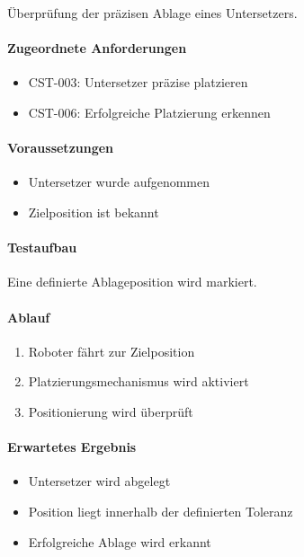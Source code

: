 \documentclass[
  a4paper,
  12pt,
  DIV=12,        %
  parskip=half,  %
  headings=small %
]{scrartcl}
\theoremstyle{definition}
\providecommand{\tightlist}{%
  \setlength{\itemsep}{0pt}\setlength{\parskip}{0pt}}
\theoremstyle{definition}
\begin{document}
Überprüfung der präzisen Ablage eines Untersetzers.

\paragraph{Zugeordnete
Anforderungen}\label{zugeordnete-anforderungen-29}

\begin{itemize}
\tightlist
\item
  CST-003: Untersetzer präzise platzieren
\item
  CST-006: Erfolgreiche Platzierung erkennen
\end{itemize}

\paragraph{Voraussetzungen}\label{voraussetzungen-28}

\begin{itemize}
\tightlist
\item
  Untersetzer wurde aufgenommen
\item
  Zielposition ist bekannt
\end{itemize}

\paragraph{Testaufbau}\label{testaufbau-5}

Eine definierte Ablageposition wird markiert.

\paragraph{Ablauf}\label{ablauf-29}

\begin{enumerate}
\def\labelenumi{\arabic{enumi}.}
\tightlist
\item
  Roboter fährt zur Zielposition
\item
  Platzierungsmechanismus wird aktiviert
\item
  Positionierung wird überprüft
\end{enumerate}

\paragraph{Erwartetes Ergebnis}\label{erwartetes-ergebnis-29}

\begin{itemize}
\tightlist
\item
  Untersetzer wird abgelegt
\item
  Position liegt innerhalb der definierten Toleranz
\item
  Erfolgreiche Ablage wird erkannt
\end{itemize}
\end{document}
